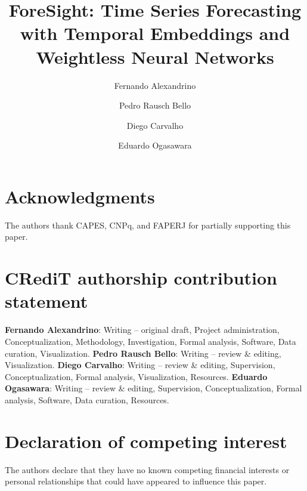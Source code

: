 \documentclass[final,3p,times,twocolumn,authoryear]{elsarticle}
\begin{document}
\begin{frontmatter}

\title{ForeSight: Time Series Forecasting with Temporal Embeddings and Weightless Neural Networks}

\author[1,2]{Fernando Alexandrino}

\author[1]{Pedro Rausch Bello}

\author[1]{Diego Carvalho}

\author[1]{Eduardo Ogasawara}




\end{frontmatter}

\section*{Acknowledgments}
The authors thank CAPES, CNPq, and FAPERJ for partially supporting this paper.

\section*{CRediT authorship contribution statement}
\textbf{Fernando Alexandrino}: Writing -- original draft, Project administration, Conceptualization, Methodology, Investigation, Formal analysis, Software, Data curation, Visualization. \textbf{Pedro Rausch Bello}: Writing -- review \& editing, Visualization. \textbf{Diego Carvalho}: Writing -- review \& editing, Supervision, Conceptualization, Formal analysis, Visualization, Resources. \textbf{Eduardo Ogasawara}: Writing -- review \& editing, Supervision, Conceptualization, Formal analysis, Software, Data curation, Resources.

\section*{Declaration of competing interest}
The authors declare that they have no known competing financial interests or personal relationships that could have appeared to influence this paper.
\end{document}
